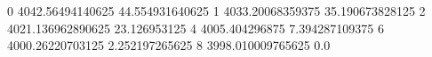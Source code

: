 0 4042.56494140625 44.554931640625
1 4033.20068359375 35.190673828125
2 4021.136962890625 23.126953125
4 4005.404296875 7.394287109375
6 4000.26220703125 2.252197265625
8 3998.010009765625 0.0
